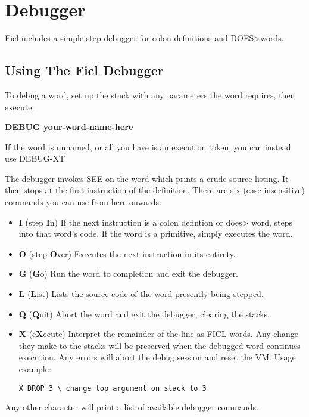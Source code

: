 \chapter{Debugger}
Ficl includes a simple step debugger for colon definitions and DOES\textgreater words.
\section{Using The Ficl Debugger}
To debug a word, set up the stack with any parameters the word requires, then execute:

\textbf{DEBUG your-word-name-here}

If the word is unnamed, or all you have is an execution token, you can
instead use DEBUG-XT

The debugger invokes SEE on the word which prints a crude source
listing. It then stops at the first instruction of the definition.
There are six (case insensitive) commands you can use from here onwards:
\begin{itemize}[noitemsep]
	\item \textbf{I} (step \textbf{I}n)\newline
	If the next instruction is a colon defintion or does\textgreater
	word, steps into that word's code. If the word is a primitive,
	simply executes the word.

	\item \textbf{O} (step \textbf{O}ver)\newline
	Executes the next instruction in its entirety.

	\item \textbf{G} (\textbf{G}o)\newline
	Run the word to completion and exit the debugger.

	\item \textbf{L} (\textbf{L}ist)\newline
	Lists the source code of the word presently being stepped.

	\item \textbf{Q} (\textbf{Q}uit)\newline
	Abort the word and exit the debugger, clearing the stacks.

	\item \textbf{X} (e\textbf{X}ecute)\newline
	Interpret the remainder of the line as FICL words. Any change
	they make to the stacks will be preserved when the debugged
	word continues execution. Any errors will abort the debug
	session and reset the VM. Usage example:
	\begin{lstlisting}[frame=single]
X DROP 3 \ change top argument on stack to 3
	\end{lstlisting}
\end{itemize}
Any other character will print a list of available debugger commands.


